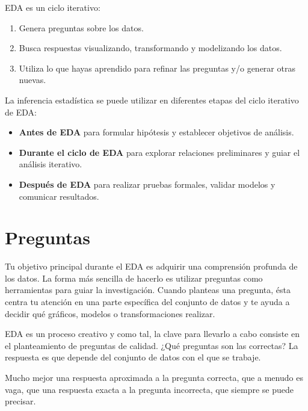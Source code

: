 \documentclass[
  letterpaper,
  DIV=11,
  numbers=noendperiod]{scrreprt}
\begin{document}
EDA es un ciclo iterativo:

\begin{enumerate}
\def\labelenumi{\arabic{enumi}.}
\item
  Genera preguntas sobre los datos.
\item
  Busca respuestas visualizando, transformando y modelizando los datos.
\item
  Utiliza lo que hayas aprendido para refinar las preguntas y/o generar
  otras nuevas.
\end{enumerate}

La inferencia estadística se puede utilizar en diferentes etapas del
ciclo iterativo de EDA:

\begin{itemize}
\item
  \textbf{Antes de EDA} para formular hipótesis y establecer objetivos
  de análisis.
\item
  \textbf{Durante el ciclo de EDA} para explorar relaciones preliminares
  y guiar el análisis iterativo.
\item
  \textbf{Después de EDA} para realizar pruebas formales, validar
  modelos y comunicar resultados.
\end{itemize}

\hypertarget{preguntas}{%
\section{Preguntas}\label{preguntas}}

Tu objetivo principal durante el EDA es adquirir una comprensión
profunda de los datos. La forma más sencilla de hacerlo es utilizar
preguntas como herramientas para guiar la investigación. Cuando planteas
una pregunta, ésta centra tu atención en una parte específica del
conjunto de datos y te ayuda a decidir qué gráficos, modelos o
transformaciones realizar.

EDA es un proceso creativo y como tal, la clave para llevarlo a cabo
consiste en el planteamiento de preguntas de calidad. ¿Qué preguntas son
las correctas? La respuesta es que depende del conjunto de datos con el
que se trabaje.

\begin{tcolorbox}[enhanced jigsaw, arc=.35mm, breakable, coltitle=black, left=2mm, opacityback=0, bottomtitle=1mm, colbacktitle=quarto-callout-tip-color!10!white, title=\textcolor{quarto-callout-tip-color}{\faLightbulb}\hspace{0.5em}{John Tukey}, titlerule=0mm, colback=white, colframe=quarto-callout-tip-color-frame, bottomrule=.15mm, rightrule=.15mm, opacitybacktitle=0.6, toptitle=1mm, toprule=.15mm, leftrule=.75mm]

Mucho mejor una respuesta aproximada a la pregunta correcta, que a
menudo es vaga, que una respuesta exacta a la pregunta incorrecta, que
siempre se puede precisar.

\end{tcolorbox}
\end{document}
